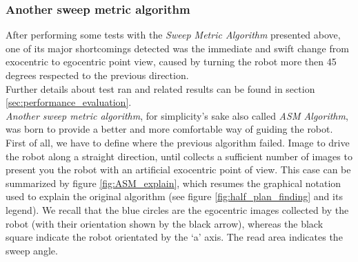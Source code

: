 \subsubsection{Another sweep metric algorithm}
\label{concr:iimageselector:another_sweep_metric_algorithm}

After performing some tests with the \textit{Sweep Metric
Algorithm} presented above, one of its major shortcomings
detected was the immediate and swift change from exocentric
to egocentric point view, caused by turning the robot
more then 45 degrees respected to the previous direction.
\\
Further details about test ran and related results can be
found in section \ref{sec:performance_evaluation}.
\\
\textit{Another sweep metric algorithm}, for simplicity's
sake also called \textit{ASM Algorithm}, was born to provide
a better and more comfortable way of guiding the robot.
\\
First of all, we have to define where the previous algorithm
failed. Image to drive the robot along a straight direction,
until \framework{} collects a sufficient number of images to
present you the robot with an artificial exocentric point of
view. This case can be summarized by figure \ref{fig:ASM_explain},
which resumes the graphical notation
used to explain the original algorithm (see figure
\ref{fig:half_plan_finding} and its legend). We recall
that the blue circles are the egocentric images collected
by the robot (with their orientation shown by the black
arrow), whereas the black square indicate the robot orientated
by the `a' axis. The read area indicates the sweep angle.

